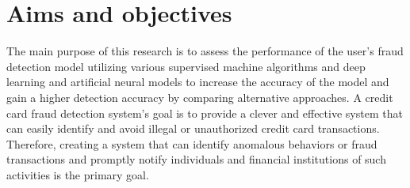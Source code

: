 \section{Aims and objectives}
\label{sec:intro_aims_obj}

The main purpose of this research is to assess the performance of the user's fraud detection model utilizing various supervised machine algorithms and deep learning and artificial neural models to increase the accuracy of the model and gain a higher detection accuracy by comparing alternative approaches. A credit card fraud detection system's goal is to provide a clever and effective system that can easily identify and avoid illegal or unauthorized credit card transactions. Therefore, creating a system that can identify anomalous behaviors or fraud transactions and promptly notify individuals and financial institutions of such activities is the primary goal.




